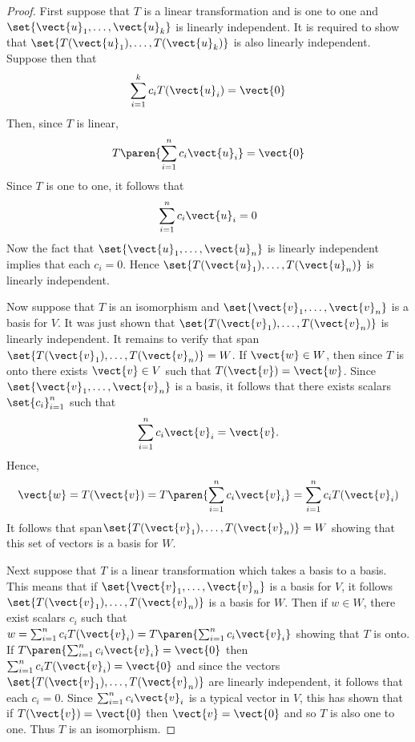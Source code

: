 \begin{proof}First suppose that $T$ is a linear transformation and is one to one
and $\set{\vect{u}_{1},\ldots,\vect{u}_{k}} $ is linearly
independent. It is required to show that $\set{T(\vect{u}_{1}),\ldots,T(\vect{
u}_{k})} $ is also linearly independent. Suppose then that
\begin{equation*}
\sum_{i=1}^{k}c_{i}T(\vect{u}_{i})=\vect{0}
\end{equation*}
Then, since $T$ is linear,
\begin{equation*}
T\paren{\sum_{i=1}^{n}c_{i}\vect{u}_{i}} =\vect{0}
\end{equation*}
Since $T$ is one to one, it follows that
\begin{equation*}
\sum_{i=1}^{n}c_{i}\vect{u}_{i}=0
\end{equation*}
Now the fact that $\set{\vect{u}_{1},\ldots,\vect{u}_{n}} $ is
linearly independent implies that each $c_{i}=0$. Hence $\set{T(\vect{u}
_{1}),\ldots,T(\vect{u}_{n})} $ is linearly independent.

Now suppose that $T$ is an isomorphism and $\set{\vect{v}_{1},\ldots,\vect{
v}_{n}} $ is a basis for $V$. It was just shown that $\set{T(\vect{v}
_{1}),\ldots,T(\vect{v}_{n})} $ is linearly independent. It remains to
verify that span$\set{T(\vect{v}_{1}),\ldots,T(\vect{v}_{n})}=W$. If $\vect{w}\in W$, then since $T$ is onto there
exists $\vect{v}\in V$ such that $T(\vect{v})=\vect{w}$. Since $\set{\vect{v}
_{1},\ldots,\vect{v}_{n}} $ is a basis, it follows that there exists
scalars $\set{c_{i}} _{i=1}^{n}$ such that
\begin{equation*}
\sum_{i=1}^{n}c_{i}\vect{v}_{i}=\vect{v}.
\end{equation*}
Hence,
\begin{equation*}
\vect{w}=T(\vect{v})=T\paren{\sum_{i=1}^{n}c_{i}\vect{v}_{i}}
=\sum_{i=1}^{n}c_{i}T(\vect{v}_{i})
\end{equation*}
It follows that span$\set{T(\vect{v}_{1}),\ldots, T(\vect{v}_{n})} =W$ showing that this set of vectors is a
basis for $W$.

Next suppose that $T$ is a linear transformation which takes a basis to a basis. This means that if $\set{\vect{v}_{1},\ldots,\vect{v}_{n}} $ is a basis for $V$, it
follows $\set{T(\vect{v}_{1}),\ldots,T(\vect{v}_{n})} $ is a basis for $
W$. Then if $w\in W$, there exist scalars $c_{i}$ such that $
w=\sum_{i=1}^{n}c_{i}T(\vect{v}_{i})=T\paren{\sum_{i=1}^{n}c_{i}\vect{v}_{i}} $
showing that $T$ is onto. If $T\paren{\sum_{i=1}^{n}c_{i}\vect{v}_{i}} =\vect{0}$
then $\sum_{i=1}^{n}c_{i}T(\vect{v}_{i})=\vect{0}$ and since the vectors $\set{T(\vect{v}
_{1}),\ldots,T(\vect{v}_{n})} $ are linearly independent, it follows
that each $c_{i}=0$. Since $\sum_{i=1}^{n}c_{i}\vect{v}_{i}$ is a typical vector in
$V$, this has shown that if $T(\vect{v})=\vect{0}$ then $\vect{v}=\vect{0}$ and so $T$ is also one to one.
Thus $T$ is an isomorphism.
\end{proof}

